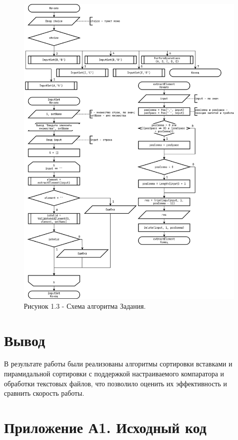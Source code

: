 \documentclass[oneside,a4paper,14pt]{extarticle}
\begin{document}
\clearpage
\begin{figure}[H]
	\centering
	\includegraphics[height=0.9\textheight]{pics/flowchart3.png}
	\caption*{Рисунок 1.3 - Схема алгоритма Задания.}
\end{figure}

\section*{Вывод}


В результате работы были реализованы алгоритмы сортировки вставками и пирамидальной сортировки с поддержкой настраиваемого компаратора и обработки текстовых файлов, что позволило оценить их эффективность и сравнить скорость работы.
\newpage
\section*{Приложение А1. Исходный код}
\inputminted{pascal}{code/main.pas}
\end{document}
